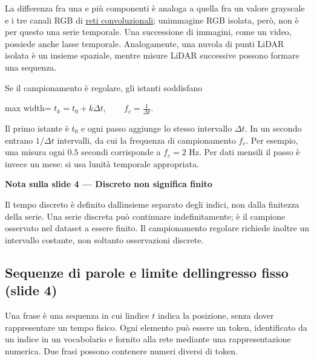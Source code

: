 \documentclass[11pt,a4paper,oneside,openany]{book}
\renewenvironment{quote}{\list{}{\leftmargin=1em\rightmargin=0pt}\item\relax}{\endlist}
\begin{document}
La differenza fra una e più componenti è analoga a quella fra un valore grayscale e i tre canali RGB di \hyperref[fonte02]{reti convoluzionali}; un\textquotesingle immagine RGB isolata, però, non è per questo una serie temporale. Una successione di immagini, come un video, possiede anche l\textquotesingle asse temporale. Analogamente, una nuvola di punti LiDAR isolata è un insieme spaziale, mentre misure LiDAR successive possono formare una sequenza.

Se il campionamento è regolare, gli istanti soddisfano

\begin{center}
\begin{adjustbox}{max width=\linewidth}
$\displaystyle \boxed{t_k=t_0+k\Delta t,\qquad f_c=\frac1{\Delta t}.}$
\end{adjustbox}
\end{center}

Il primo istante è \(t_0\) e ogni passo aggiunge lo stesso intervallo \(\Delta t\). In un secondo entrano \(1/\Delta t\) intervalli, da cui la frequenza di campionamento \(f_c\). Per esempio, una misura ogni \(0.5\) secondi corrisponde a \(f_c=2\) Hz. Per dati mensili il passo è invece un mese: si usa l\textquotesingle unità temporale appropriata.

\begin{quote}
\textbf{Nota sulla slide 4 --- Discreto non significa finito}
\end{quote}

\begin{quote}
Il tempo discreto è definito dall\textquotesingle insieme separato degli indici, non dalla finitezza della serie. Una serie discreta può continuare indefinitamente; è il campione osservato nel dataset a essere finito. Il campionamento regolare richiede inoltre un intervallo costante, non soltanto osservazioni discrete.
\end{quote}

\subsection{Sequenze di parole e limite dell\textquotesingle ingresso fisso (slide 4)}\label{f03-r58}

Una frase è una sequenza in cui l\textquotesingle indice \(t\) indica la posizione, senza dover rappresentare un tempo fisico. Ogni elemento può essere un token, identificato da un indice in un vocabolario e fornito alla rete mediante una rappresentazione numerica. Due frasi possono contenere numeri diversi di token.
\end{document}
